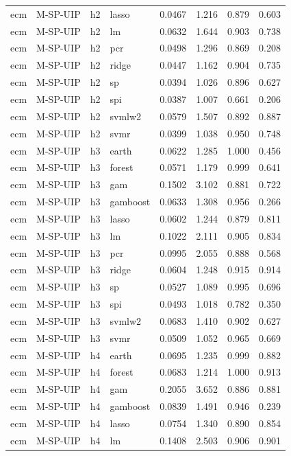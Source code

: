 \begin{ThreePartTable}
\begin{longtable}[t]{llclcccc}
ecm & M-SP-UIP & h2 & lasso & 0.0467 & 1.216 & 0.879 & 0.603\\
ecm & M-SP-UIP & h2 & lm & 0.0632 & 1.644 & 0.903 & 0.738\\
ecm & M-SP-UIP & h2 & pcr & 0.0498 & 1.296 & 0.869 & 0.208\\
ecm & M-SP-UIP & h2 & ridge & 0.0447 & 1.162 & 0.904 & 0.735\\
ecm & M-SP-UIP & h2 & sp & 0.0394 & 1.026 & 0.896 & 0.627\\
ecm & M-SP-UIP & h2 & spi & 0.0387 & 1.007 & 0.661 & 0.206\\
ecm & M-SP-UIP & h2 & svmlw2 & 0.0579 & 1.507 & 0.892 & 0.887\\
ecm & M-SP-UIP & h2 & svmr & 0.0399 & 1.038 & 0.950 & 0.748\\
\addlinespace
ecm & M-SP-UIP & h3 & earth & 0.0622 & 1.285 & 1.000 & 0.456\\
ecm & M-SP-UIP & h3 & forest & 0.0571 & 1.179 & 0.999 & 0.641\\
ecm & M-SP-UIP & h3 & gam & 0.1502 & 3.102 & 0.881 & 0.722\\
ecm & M-SP-UIP & h3 & gamboost & 0.0633 & 1.308 & 0.956 & 0.266\\
ecm & M-SP-UIP & h3 & lasso & 0.0602 & 1.244 & 0.879 & 0.811\\
ecm & M-SP-UIP & h3 & lm & 0.1022 & 2.111 & 0.905 & 0.834\\
ecm & M-SP-UIP & h3 & pcr & 0.0995 & 2.055 & 0.888 & 0.568\\
ecm & M-SP-UIP & h3 & ridge & 0.0604 & 1.248 & 0.915 & 0.914\\
ecm & M-SP-UIP & h3 & sp & 0.0527 & 1.089 & 0.995 & 0.696\\
ecm & M-SP-UIP & h3 & spi & 0.0493 & 1.018 & 0.782 & 0.350\\
ecm & M-SP-UIP & h3 & svmlw2 & 0.0683 & 1.410 & 0.902 & 0.627\\
ecm & M-SP-UIP & h3 & svmr & 0.0509 & 1.052 & 0.965 & 0.669\\
\addlinespace
ecm & M-SP-UIP & h4 & earth & 0.0695 & 1.235 & 0.999 & 0.882\\
ecm & M-SP-UIP & h4 & forest & 0.0683 & 1.214 & 1.000 & 0.913\\
ecm & M-SP-UIP & h4 & gam & 0.2055 & 3.652 & 0.886 & 0.881\\
ecm & M-SP-UIP & h4 & gamboost & 0.0839 & 1.491 & 0.946 & 0.239\\
ecm & M-SP-UIP & h4 & lasso & 0.0754 & 1.340 & 0.890 & 0.854\\
ecm & M-SP-UIP & h4 & lm & 0.1408 & 2.503 & 0.906 & 0.901\\

\end{longtable}
\end{ThreePartTable}
